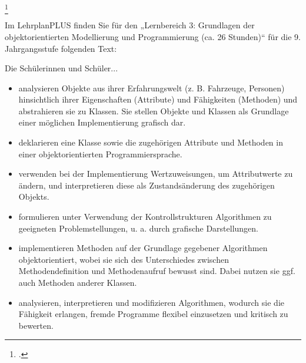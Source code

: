 \documentclass{bschlangaul-aufgabe}
\begin{document}
\footcite{examen:66118:2021:03}

Im LehrplanPLUS finden Sie für den „Lernbereich 3: Grundlagen der
objektorientierten Modellierung und Programmierung (ca. 26 Stunden)“ für
die 9. Jahrgangsstufe folgenden Text:

\begin{liKasten}


Die Schülerinnen und Schüler...

\begin{itemize}

\item analysieren Objekte aus ihrer Erfahrungswelt (z. B. Fahrzeuge,
Personen) hinsichtlich ihrer Eigenschaften (Attribute) und Fähigkeiten
(Methoden) und abstrahieren sie zu Klassen. Sie stellen Objekte und
Klassen als Grundlage einer möglichen Implementierung grafisch dar.

\item deklarieren eine Klasse sowie die zugehörigen Attribute und
Methoden in einer objektorientierten Programmiersprache.

\item verwenden bei der Implementierung Wertzuweisungen, um
Attributwerte zu ändern, und interpretieren diese als Zustandsänderung
des zugehörigen Objekts.

\item formulieren unter Verwendung der Kontrollstrukturen Algorithmen zu
geeigneten Problemstellungen, u. a. durch grafische Darstellungen.

\item implementieren Methoden auf der Grundlage gegebener Algorithmen
objektorientiert, wobei sie sich des Unterschiedes zwischen
Methodendefinition und Methodenaufruf bewusst sind. Dabei nutzen sie
ggf. auch Methoden anderer Klassen.

\item analysieren, interpretieren und modifizieren Algorithmen, wodurch
sie die Fähigkeit erlangen, fremde Programme flexibel einzusetzen und
kritisch zu bewerten.


\end{itemize}
\end{liKasten}
\end{document}

